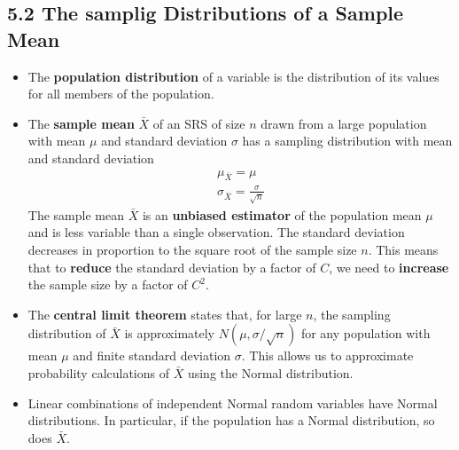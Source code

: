 	\subsection{5.2 The samplig Distributions of a Sample Mean}
		\begin{itemize}
			\item The \textbf{population distribution} of a variable is the distribution of its values for all members of the population.
			
			\item The \textbf{sample mean} $\bar{X}$ of an SRS of size $n$ drawn from a large population with mean $\mu$ and standard deviation $\sigma$ has a sampling distribution with mean and standard deviation
			\begin{align*}
				\mu_{\bar{X}}=\mu\\
				\sigma_{\bar{X}}=\frac{\sigma}{\sqrt{n}}
			\end{align*}
			The sample mean $\bar{X}$ is an \textbf{unbiased estimator} of the population mean $\mu$ and is less variable than a single observation. The standard deviation decreases in proportion to the square root of the sample size $n$. This means that to \textbf{reduce} the standard deviation by a factor of $C$, we need to \textbf{increase} the sample size by a factor of $C^2$.
			
			\item The \textbf{central limit theorem} states that, for large $n$, the sampling distribution of $\bar{X}$ is approximately $N(\mu, \sigma/\sqrt{n})$ for any population with mean $\mu$ and finite standard deviation $\sigma$. This allows us to approximate probability calculations of $\bar{X}$ using the Normal distribution.
			
			\item Linear combinations of independent Normal random variables have Normal distributions. In particular, if the population has a Normal distribution, so does $\bar{X}$.
		\end{itemize}

